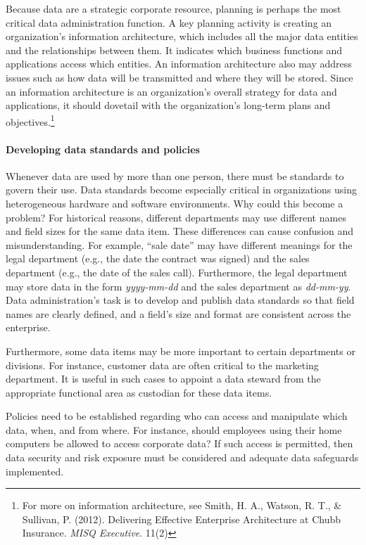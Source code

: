 \documentclass[
]{article}
\begin{document}
Because data are a strategic corporate resource, planning is perhaps the
most critical data administration function. A key planning activity is
creating an organization's information architecture, which includes all
the major data entities and the relationships between them. It indicates
which business functions and applications access which entities. An
information architecture also may address issues such as how data will
be transmitted and where they will be stored. Since an information
architecture is an organization's overall strategy for data and
applications, it should dovetail with the organization's long-term plans
and objectives.\footnote{For more on information architecture, see Smith, H. A., Watson, R.
  T., \& Sullivan, P. (2012). Delivering Effective Enterprise
  Architecture at Chubb Insurance. \emph{MISQ Executive}. 11(2)}

\hypertarget{developing-data-standards-and-policies}{%
\paragraph*{Developing data standards and policies}\label{developing-data-standards-and-policies}}

Whenever data are used by more than one person, there must be standards
to govern their use. Data standards become especially critical in
organizations using heterogeneous hardware and software environments.
Why could this become a problem? For historical reasons, different
departments may use different names and field sizes for the same data
item. These differences can cause confusion and misunderstanding. For
example, ``sale date'' may have different meanings for the legal
department (e.g., the date the contract was signed) and the sales
department (e.g., the date of the sales call). Furthermore, the legal
department may store data in the form \emph{yyyy-mm-dd} and the sales
department as \emph{dd-mm-yy}. Data administration's task is to develop and
publish data standards so that field names are clearly defined, and a
field's size and format are consistent across the enterprise.

Furthermore, some data items may be more important to certain
departments or divisions. For instance, customer data are often critical
to the marketing department. It is useful in such cases to appoint a
data steward from the appropriate functional area as custodian for these
data items.

Policies need to be established regarding who can access and manipulate
which data, when, and from where. For instance, should employees using
their home computers be allowed to access corporate data? If such access
is permitted, then data security and risk exposure must be considered
and adequate data safeguards implemented.
\end{document}
